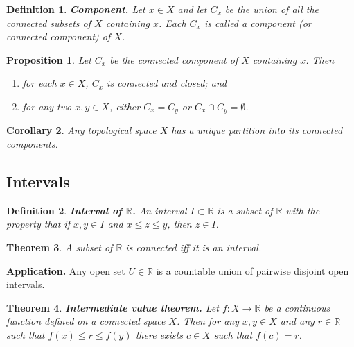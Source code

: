 \documentclass[two column]{article}
\newtheorem{theorem}{Theorem}[subsection]
\newtheorem{proposition}[theorem]{Proposition}
\newtheorem{corollary}[theorem]{Corollary}
\newtheorem{definition}{Definition}[subsection]
\begin{document}
\begin{definition}
{\bf Component.} Let $x \in X$ and let $C_{x}$ be the union of all the connected subsets of $X$ containing $x$. Each $C_{x}$ is called a  component (or connected component) of $X$. \\
\end{definition}

\begin{proposition}
Let $C_{x}$ be the connected component of $X$ containing $x$. Then 
\begin{enumerate}
\item for each $x \in X$, $C_{x}$ is connected and closed; and
\item for any two $x,y \in X$, either $C_{x} = C_{y}$ or $C_{x} \cap C_{y} = \emptyset$. \\
\end{enumerate}
\end{proposition}

\begin{corollary}
Any topological space $X$ has a unique partition into its connected components. 
\end{corollary}

\subsection{Intervals}

\begin{definition}
{\bf Interval of $\mathbb{R}$.} An interval $I \subset \mathbb{R}$ is a subset of $\mathbb{R}$ with the property that if $x,y \in I$ and $x \leq z \leq y$, then $z \in I$. \\ 
\end{definition}

\begin{theorem}
A subset of $\mathbb{R}$ is connected iff it is an interval.
\end{theorem}

{\bf Application.} Any open set $U \in \mathbb{R}$ is a countable union of pairwise disjoint open intervals. \\  

\begin{theorem}
{\bf Intermediate value theorem.} Let $f : X \rightarrow \mathbb{R}$ be a continuous function defined on a connected space $X$. Then for any $x,y \in X$ and any $r \in \mathbb{R}$ such that $f(x) \leq r \leq f(y)$ there exists $c \in X$ such that $f(c) = r$. \\
\end{theorem}
\end{document}
